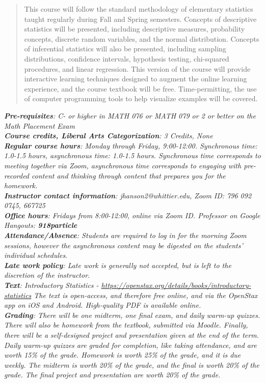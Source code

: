 \documentclass[10pt]{article}
\begin{document}
\maketitle

\begin{abstract}
This course will follow the standard methodology of elementary statistics taught regularly during Fall and Spring semesters. Concepts of descriptive statistics will be presented, including descriptive measures, probability concepts, discrete random variables, and the normal distribution. Concepts of inferential statistics will also be presented, including sampling distributions, confidence intervals, hypothesis testing, chi-squared procedures, and linear regression. This version of the course will provide interactive learning techniques designed to augment the online learning experience, and the course textbook will be free.  Time-permitting, the use of computer programming tools to help visualize examples will be covered.
\end{abstract}
\noindent
\textit{\textbf{Pre-requisites}: C- or higher in MATH 076 or MATH 079 or 2 or better on the Math Placement Exam } \\
\textit{\textbf{Course credits, Liberal Arts Categorization}: 3 Credits, None} \\
\textit{\textbf{Regular course hours}: Monday through Friday, 9:00-12:00.  Synchronous time: 1.0-1.5 hours, asynchronous time: 1.0-1.5 hours.  Synchronous time corresponds to meeting together via Zoom, asynchronous time corresponds to engaging with pre-recorded content and thinking through content that prepares you for the homework.} \\
\textit{\textbf{Instructor contact information}: jhanson2@whittier.edu, Zoom ID: 796 092 0745, 667725} \\
\textit{\textbf{Office hours}: Fridays from 8:00-12:00, online via Zoom ID. Professor on Google Hangouts: \textbf{918particle}} \\
\textit{\textbf{Attendance/Absence}: Students are required to log in for the morning Zoom sessions, however the asynchronous content may be digested on the students' individual schedules}.\\ 
\textit{\textbf{Late work policy}: Late work is generally not accepted, but is left to the discretion of the instructor.} \\
\textit{\textbf{Text}: Introductory Statistics - \url{https://openstax.org/details/books/introductory-statistics} The text is open-access, and therefore free online, and via the OpenStax app on iOS and Android.  High-quality PDF is available online.} \\
\textit{\textbf{Grading}: There will be one midterm, one final exam, and daily warm-up quizzes.  There will also be homework from the textbook, submitted via Moodle.  Finally, there will be a self-designed project and presentation given at the end of the term.  Daily warm-up quizzes are graded for completion, like taking attendance, and are worth 15\% of the grade.  Homework is worth 25\% of the grade, and it is due weekly.  The midterm is worth 20\% of the grade, and the final is worth 20\% of the grade.  The final project and presentation are worth 20\% of the grade.} \\
\end{document}
